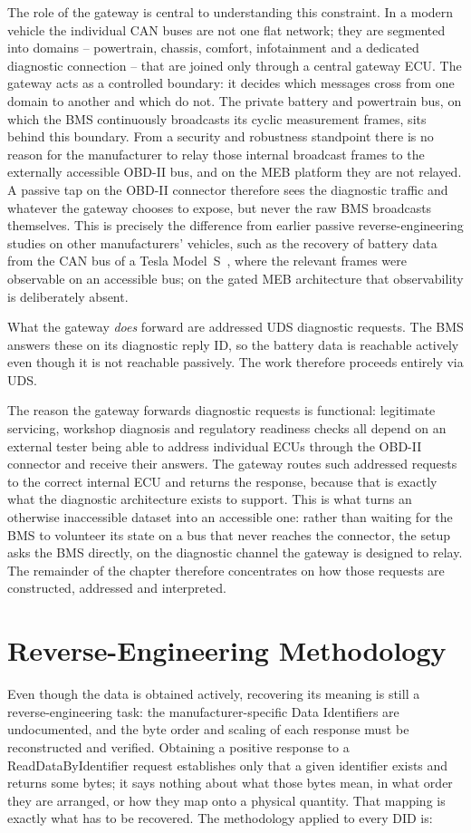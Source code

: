 \documentclass[11pt,a4paper,oneside,parskip=half]{scrreprt}
\begin{document}
The role of the gateway is central to understanding this constraint. In a modern vehicle the individual CAN buses are not one flat network; they are segmented into domains -- powertrain, chassis, comfort, infotainment and a dedicated diagnostic connection -- that are joined only through a central gateway ECU. The gateway acts as a controlled boundary: it decides which messages cross from one domain to another and which do not. The private battery and powertrain bus, on which the BMS continuously broadcasts its cyclic measurement frames, sits behind this boundary. From a security and robustness standpoint there is no reason for the manufacturer to relay those internal broadcast frames to the externally accessible OBD-II bus, and on the MEB platform they are not relayed. A passive tap on the OBD-II connector therefore sees the diagnostic traffic and whatever the gateway chooses to expose, but never the raw BMS broadcasts themselves. This is precisely the difference from earlier passive reverse-engineering studies on other manufacturers' vehicles, such as the recovery of battery data from the CAN bus of a Tesla Model~S~\cite{huybrechts2018reverse}, where the relevant frames were observable on an accessible bus; on the gated MEB architecture that observability is deliberately absent.

What the gateway \emph{does} forward are addressed UDS diagnostic requests. The BMS answers these on its diagnostic reply ID, so the battery data is reachable actively even though it is not reachable passively. The work therefore proceeds entirely via UDS.

The reason the gateway forwards diagnostic requests is functional: legitimate servicing, workshop diagnosis and regulatory readiness checks all depend on an external tester being able to address individual ECUs through the OBD-II connector and receive their answers. The gateway routes such addressed requests to the correct internal ECU and returns the response, because that is exactly what the diagnostic architecture exists to support. This is what turns an otherwise inaccessible dataset into an accessible one: rather than waiting for the BMS to volunteer its state on a bus that never reaches the connector, the setup asks the BMS directly, on the diagnostic channel the gateway is designed to relay. The remainder of the chapter therefore concentrates on how those requests are constructed, addressed and interpreted.

\section{Reverse-Engineering Methodology}
\label{sec:re_methodology}
Even though the data is obtained actively, recovering its meaning is still a reverse-engineering task: the manufacturer-specific Data Identifiers are undocumented, and the byte order and scaling of each response must be reconstructed and verified. Obtaining a positive response to a ReadDataByIdentifier request establishes only that a given identifier exists and returns some bytes; it says nothing about what those bytes mean, in what order they are arranged, or how they map onto a physical quantity. That mapping is exactly what has to be recovered. The methodology applied to every DID is:
\end{document}
